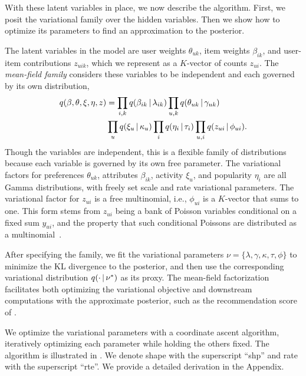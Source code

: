With these latent variables in place, we now describe the algorithm.
First, we posit the variational family over the hidden variables.
Then we show how to optimize its parameters to find
an approximation to the posterior.

The latent variables in the model are user weights $\theta_{uk}$, item
weights $\beta_{ik}$, and user-item contributions $z_{uik}$, which we
represent as a $K$-vector of counts $z_{ui}$.  The \textit{mean-field
  family} considers these variables to be independent and each
governed by its own distribution,
\begin{align*}
  \label{eq:q}
  q(\beta, \theta, \xi, \eta, z) & =  \prod_{i,k} q(\beta_{ik} \,\vert\, \lambda_{ik})
  \prod_{u,k} q(\theta_{uk} \,\vert\, \gamma_{uk}) \nonumber\\
  & \prod_{u} q(\xi_u \,\vert\, \kappa_u) \prod_{i} q(\eta_i \,\vert\, \tau_i)
  \prod_{u,i} q(z_{ui} \,\vert\, \phi_{ui}).
\end{align*}
Though the variables are independent, this is a flexible family of
distributions because each variable is governed by its own free
parameter.  The variational factors for preferences $\theta_{uk}$,
attributes $\beta_{ik}$, activity $\xi_u$, and popularity $\eta_i$ are
all Gamma distributions, with freely set scale and rate variational
parameters. The variational factor
for $z_{ui}$ is a free multinomial, i.e., $\phi_{ui}$ is a $K$-vector
that sums to one.  This form stems from $z_{ui}$ being a bank of
Poisson variables conditional on a fixed sum $y_{ui}$, and the
property that such conditional Poissons are distributed as a
multinomial~\cite{Johnson:2005, Cemgil:2009}.



After specifying the family, we fit the variational parameters $\nu =
\{\lambda, \gamma, \kappa, \tau, \phi\}$ to minimize the KL divergence
to the posterior, and then use the corresponding variational
distribution $q(\cdot \,\vert\, \nu^*)$ as its proxy. The mean-field
factorization facilitates both optimizing the variational objective
and downstream computations with the approximate posterior, such as
the recommendation score of .


We optimize the variational parameters with a coordinate ascent
algorithm, iteratively optimizing each parameter while holding the
others fixed.  The algorithm is illustrated in . We
denote shape with the superscript ``shp'' and rate with the
superscript ``rte''. We provide a detailed derivation in the Appendix.

